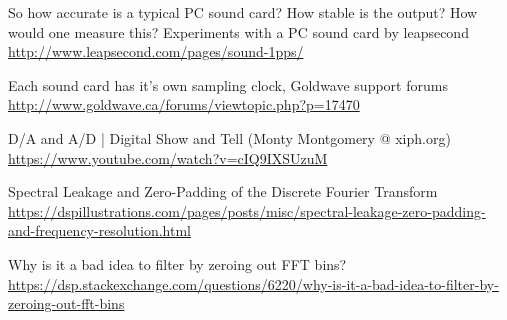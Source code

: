 \documentclass[10pt,a4paper]{report}
\begin{document}
\begin{thebibliography}{9}
	So how accurate is a typical PC sound card? How stable is the output? How would one measure this?
	Experiments with a PC sound card by leapsecond
	\url{http://www.leapsecond.com/pages/sound-1pps/}
	
	Each sound card has it's own sampling clock, Goldwave support forums
	\url{http://www.goldwave.ca/forums/viewtopic.php?p=17470}
	
	D/A and A/D | Digital Show and Tell (Monty Montgomery @ xiph.org)
	\url{https://www.youtube.com/watch?v=cIQ9IXSUzuM}
	
	Spectral Leakage and Zero-Padding of the Discrete Fourier Transform
	\url{https://dspillustrations.com/pages/posts/misc/spectral-leakage-zero-padding-and-frequency-resolution.html}
	
	Why is it a bad idea to filter by zeroing out FFT bins?
	\url{https://dsp.stackexchange.com/questions/6220/why-is-it-a-bad-idea-to-filter-by-zeroing-out-fft-bins}
	
\end{thebibliography}
\end{document}

